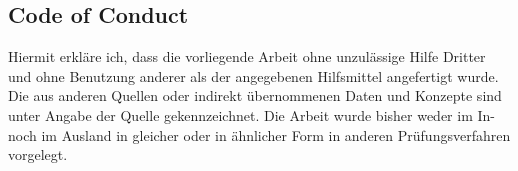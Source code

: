 \documentclass[12pt,a4paper,parskip=full,abstract=true,BCOR=10mm,twoside,open=right]{scrreprt}
\begin{document}
\begin{appendix}
\begin{otherlanguage}{ngerman}
    \chapter*{Code of Conduct}
    Hiermit erkl\"are ich, dass die vorliegende Arbeit ohne unzul\"assige Hilfe Dritter und ohne Benutzung
    anderer als der angegebenen Hilfsmittel angefertigt wurde. Die aus anderen Quellen oder indirekt
    \"ubernommenen Daten und Konzepte sind unter Angabe der Quelle gekennzeichnet.
    Die Arbeit wurde bisher weder im In- noch im Ausland in gleicher oder in \"ahnlicher Form in anderen
    Pr\"ufungsverfahren vorgelegt.

    \par\noindent\makebox[7cm]{\hrulefill}      \hfill\makebox[5cm]{\hrulefill}%
    \par\noindent{} \hfill{}%
\end{otherlanguage}

    \end{appendix}
\end{document}
